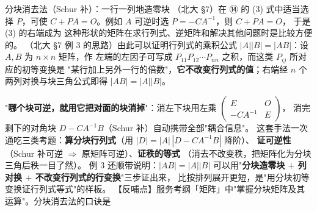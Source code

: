 \begin{fdeep}{分块消去法（Schur 补）：一行一列地造零块}
（北大 §7）在 ⑭ 的 (3) 式中适当选择 $P$，可使 $C+PA=O$。例如 $A$ 可逆时选 $P=-CA^{-1}$，则 $C+PA=O$，
于是 (3) 的右端成为
这种形状的矩阵在求行列式、逆矩阵和解决其他问题时是比较方便的。
（北大 §7 例 3 的思路）由此可以证明行列式的乘积公式 $|A||B|=|AB|$：设 $A,B$ 为 $n\times n$ 矩阵，作
左端的左因子可写成 $P_{11}P_{12}\cdots P_{nn}$ 之积，而这类 $P_{ij}$ 所对应的初等变换是
"某行加上另外一行的倍数"，\textbf{它不改变行列式的值}；右端经 $n$ 个两列对换与块三角公式即得 $|AB|=|A||B|$。

"\textbf{哪个块可逆，就用它把对面的块消掉}"：消左下块用左乘 $\begin{pmatrix}E&O\\-CA^{-1}&E\end{pmatrix}$，
消完剩下的对角块 $D-CA^{-1}B$（Schur 补）自动携带全部"耦合信息"。
这套手法一次通吃三类考题：\textbf{算分块行列式}（用 $|D|=|A|\,|D-CA^{-1}B|$ 降阶）、
\textbf{证可逆性}（Schur 补可逆 $\Rightarrow$ 原矩阵可逆）、\textbf{证秩的等式}
（消去不改变秩，把矩阵化为分块三角后秩一目了然）。
例 3 还顺带说明：$|AB|=|A||B|$ 可以用"\textbf{分块造零块 $+$ 列对换 $+$ 不改变行列式的行变换}"三步证出来，
比按排列展开更短，是"用分块初等变换证行列式等式"的样板。
【反哺点】服务考纲「矩阵」中"掌握分块矩阵及其运算"。分块消去法的口诀是
\end{fdeep}

